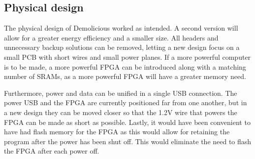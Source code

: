 \documentclass[../main/report.tex]{subfiles}
\begin{document}
\subsection{Physical design}
The physical design of Demolicious worked as intended.
A second version will allow for a greater energy efficiency and a smaller size.
All headers and unnecessary backup solutions can be removed, letting a new design focus on a small PCB with short wires and small power planes.
If a more powerful computer is to be made, a more powerful FPGA can be introduced along with a matching number of SRAMs, as a more powerful FPGA will have a greater memory need.

Furthermore, power and data can be unified in a single USB connection.
The power USB and the FPGA are currently positioned far from one another, but in a new design they can be moved closer so that the 1.2V wire that powers the FPGA can be made as short as possible.
Lastly, it would have been convenient to have had flash memory for the FPGA as this would allow for retaining the program after the power has been shut off.
This would eliminate the need to flash the FPGA after each power off.
\end{document}
